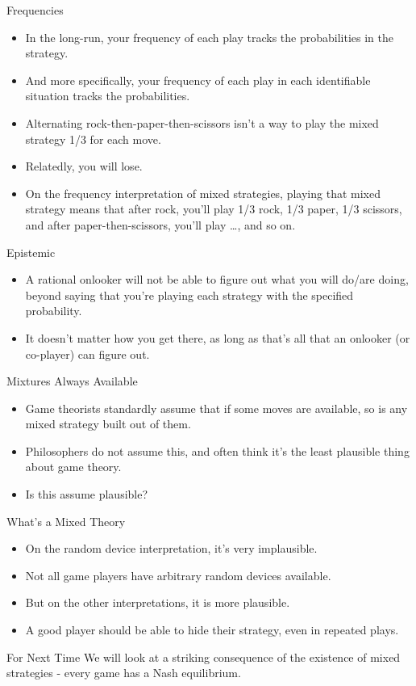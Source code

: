 \documentclass[
  ignorenonframetext,
]{beamer}
\providecommand{\tightlist}{%
  \setlength{\itemsep}{0pt}\setlength{\parskip}{0pt}}
\begin{document}
\begin{frame}{Frequencies}
\protect\hypertarget{frequencies}{}
\begin{itemize}
\tightlist
\item
  In the long-run, your frequency of each play tracks the probabilities
  in the strategy.
\item
  And more specifically, your frequency of each play in each
  identifiable situation tracks the probabilities.
\item
  Alternating rock-then-paper-then-scissors isn't a way to play the
  mixed strategy 1/3 for each move.
\item
  Relatedly, you will lose.
\item
  On the frequency interpretation of mixed strategies, playing that
  mixed strategy means that after rock, you'll play 1/3 rock, 1/3 paper,
  1/3 scissors, and after paper-then-scissors, you'll play \ldots, and
  so on.
\end{itemize}
\end{frame}

\begin{frame}{Epistemic}
\protect\hypertarget{epistemic}{}
\begin{itemize}
\tightlist
\item
  A rational onlooker will not be able to figure out what you will
  do/are doing, beyond saying that you're playing each strategy with the
  specified probability.
\item
  It doesn't matter how you get there, as long as that's all that an
  onlooker (or co-player) can figure out.
\end{itemize}
\end{frame}

\begin{frame}{Mixtures Always Available}
\protect\hypertarget{mixtures-always-available}{}
\begin{itemize}
\tightlist
\item
  Game theorists standardly assume that if some moves are available, so
  is any mixed strategy built out of them.
\item
  Philosophers do not assume this, and often think it's the least
  plausible thing about game theory.
\item
  Is this assume plausible?
\end{itemize}
\end{frame}

\begin{frame}{What's a Mixed Theory}
\protect\hypertarget{whats-a-mixed-theory}{}
\begin{itemize}
\tightlist
\item
  On the random device interpretation, it's very implausible.
\item
  Not all game players have arbitrary random devices available.
\item
  But on the other interpretations, it is more plausible.
\item
  A good player should be able to hide their strategy, even in repeated
  plays.
\end{itemize}
\end{frame}

\begin{frame}{For Next Time}
\protect\hypertarget{for-next-time}{}
We will look at a striking consequence of the existence of mixed
strategies - every game has a Nash equilibrium.
\end{frame}
\end{document}
